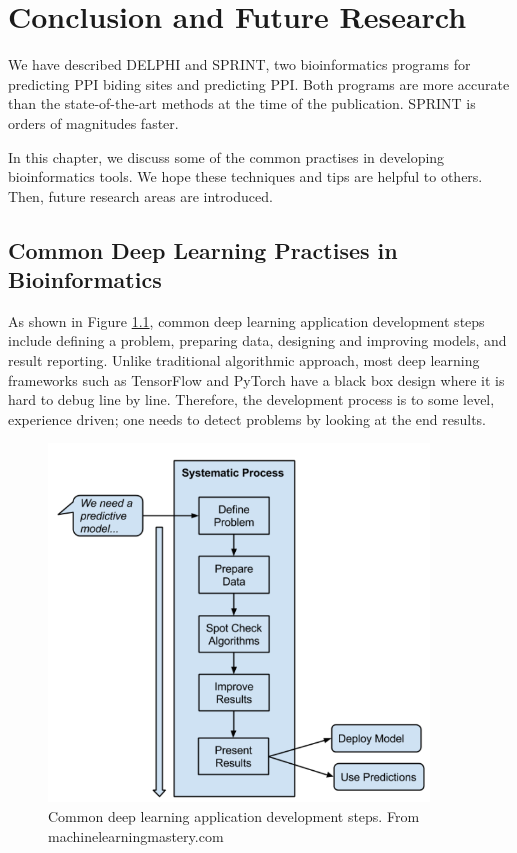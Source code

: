 \chapter{Conclusion and Future Research \label{chap_4}}
We have described DELPHI and SPRINT, two bioinformatics programs for predicting PPI biding sites and predicting PPI. Both programs are more accurate than the state-of-the-art methods at the time of the publication. SPRINT is orders of magnitudes faster. 

In this chapter, we discuss some of the common practises in developing bioinformatics tools. We hope these techniques and tips are helpful to others. Then, future research areas are introduced.
\section{Common Deep Learning Practises in Bioinformatics}
As shown in Figure \ref{fig_deep_learning_step}, common deep learning application development steps include defining a problem, preparing data, designing and improving models, and result reporting. Unlike traditional algorithmic approach, most deep learning frameworks such as TensorFlow and PyTorch have a black box design where it is hard to debug line by line. Therefore, the development process is to some level, experience driven; one needs to detect problems by looking at the end results. 
\begin{figure}[h!]
\begin{center}
\includegraphics[height=9.5cm]{img/machine_learning_in_bioinf.png}
\caption[Common deep learning application development steps]{Common deep learning application development steps. From machinelearningmastery.com \label{fig_deep_learning_step}}
\end{center}
\end{figure}
